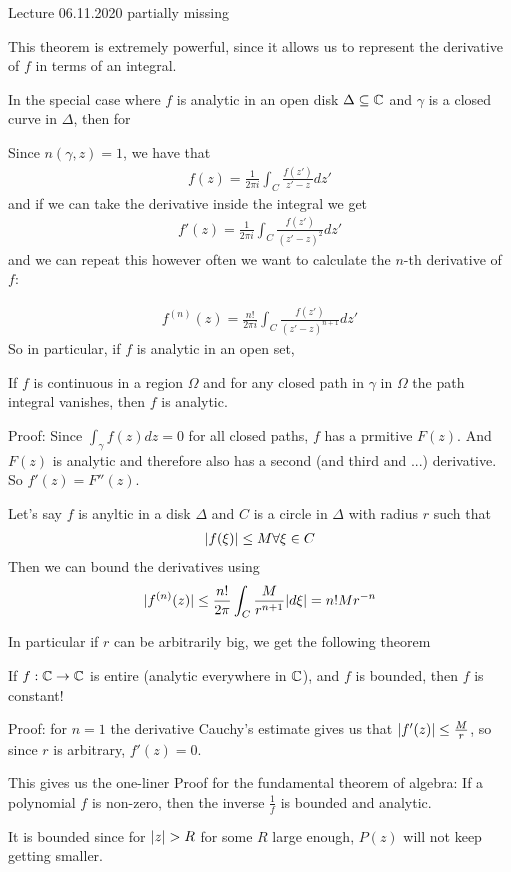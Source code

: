 \begin{center}
	Lecture 06.11.2020 partially missing
\end{center}
This theorem is extremely powerful, since it allows us to represent the derivative of $f$ in terms of an integral.


In the special case where $f$ is analytic in an open disk $\Delta \subseteq \mathbb{C}$ and $\gamma$ is a closed curve in $\Delta$, then for 

Since $n(\gamma,z) = 1$, we have that
\begin{align*}
	f(z) = \frac{1}{2\pi i} \int_C \frac{f(z')}{z' - z}dz'
\end{align*}
and if we can take the derivative inside the integral we get
\begin{align*}
	f'(z) = \frac{1}{2\pi i} \int_C \frac{f(z')}{(z' -z)^2}dz'
\end{align*}
and we can repeat this however often we want to calculate the $n$-th derivative of $f$:

\begin{align*}
	f^{(n)}(z) = \frac{n!}{2\pi i} \int_C \frac{f(z')}{(z' - z)^{n+1}}d z'
\end{align*}
So in particular, if $f$ is analytic in an open set, 


\begin{ntheorem}
If $f$ is continuous in a region $\Omega$ and for any closed path in $\gamma$ in $\Omega$ the path integral vanishes, then $f$ is analytic.
\end{ntheorem}
Proof: Since $\int_{\gamma} f(z) dz = 0$ for all closed paths, $f$ has a prmitive $F(z)$. And $F(z)$ is analytic and therefore also has a second (and third and ...) derivative. So $f'(z) = F''(z)$.


\begin{ntheorem}
	Let's say $f$ is anyltic in a disk $\Delta$ and $C$ is a circle in $\Delta$ with radius $r$ such that
	\begin{align*}
		\vert f(\xi)\vert \leq M \forall \xi \in C
	\end{align*}
Then we can bound the derivatives using
\begin{align*}
	\vert f^{(n)}(z)\vert \leq \frac{n!}{2\pi} \int_C \frac{M}{r^{n+1}} \vert d \xi\vert = n! M r^{-n}
\end{align*}
\end{ntheorem}
In particular if $r$ can be arbitrarily big, we get the following theorem
\begin{ntheorem}
	If $f: \mathbb{C} \to \mathbb{C}$ is entire (analytic everywhere in $\mathbb{C}$), and $f$ is bounded, then $f$ is constant!
\end{ntheorem}
Proof: for $n = 1$ the derivative Cauchy's estimate gives us that $\vert f'(z)\vert \leq \frac{M}{r}$, so since $r$ is arbitrary, $f'(z) = 0$.

This gives us the one-liner Proof for the fundamental theorem of algebra: If a polynomial $f$ is non-zero, then the inverse $\frac{1}{f}$ is bounded and analytic.

It is bounded since for $\vert z\vert > R$ for some $R$ large enough, $P(z)$ will not keep getting smaller.




